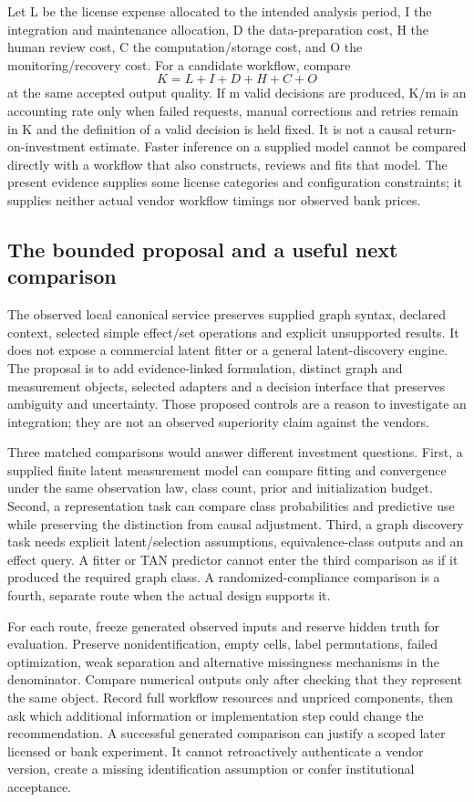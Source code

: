 Let L be the license expense allocated to the intended analysis period,
I the integration and maintenance allocation, D the data-preparation
cost, H the human review cost, C the computation/storage cost, and O the
monitoring/recovery cost. For a candidate workflow, compare \[
 K=L+I+D+H+C+O
\] at the same accepted output quality. If m valid decisions are
produced, K/m is an accounting rate only when failed requests, manual
corrections and retries remain in K and the definition of a valid
decision is held fixed. It is not a causal return-on-investment
estimate. Faster inference on a supplied model cannot be compared
directly with a workflow that also constructs, reviews and fits that
model. The present evidence supplies some license categories and
configuration constraints; it supplies neither actual vendor workflow
timings nor observed bank prices.

\hypertarget{the-bounded-proposal-and-a-useful-next-comparison}{%
\subsection{The bounded proposal and a useful next
comparison}\label{the-bounded-proposal-and-a-useful-next-comparison}}

The observed local canonical service preserves supplied graph syntax,
declared context, selected simple effect/set operations and explicit
unsupported results. It does not expose a commercial latent fitter or a
general latent-discovery engine. The proposal is to add evidence-linked
formulation, distinct graph and measurement objects, selected adapters
and a decision interface that preserves ambiguity and uncertainty. Those
proposed controls are a reason to investigate an integration; they are
not an observed superiority claim against the vendors.

Three matched comparisons would answer different investment questions.
First, a supplied finite latent measurement model can compare fitting
and convergence under the same observation law, class count, prior and
initialization budget. Second, a representation task can compare class
probabilities and predictive use while preserving the distinction from
causal adjustment. Third, a graph discovery task needs explicit
latent/selection assumptions, equivalence-class outputs and an effect
query. A fitter or TAN predictor cannot enter the third comparison as if
it produced the required graph class. A randomized-compliance comparison
is a fourth, separate route when the actual design supports it.

For each route, freeze generated observed inputs and reserve hidden
truth for evaluation. Preserve nonidentification, empty cells, label
permutations, failed optimization, weak separation and alternative
missingness mechanisms in the denominator. Compare numerical outputs
only after checking that they represent the same object. Record full
workflow resources and unpriced components, then ask which additional
information or implementation step could change the recommendation. A
successful generated comparison can justify a scoped later licensed or
bank experiment. It cannot retroactively authenticate a vendor version,
create a missing identification assumption or confer institutional
acceptance.
